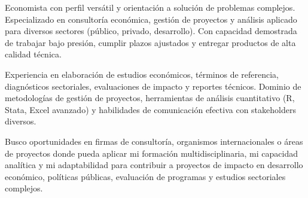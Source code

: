 \par{
	
	Economista con perfil versátil y orientación a solución de problemas complejos. Especializado en consultoría económica, gestión de proyectos y análisis aplicado para diversos sectores (público, privado, desarrollo). Con capacidad demostrada de trabajar bajo presión, cumplir plazos ajustados y entregar productos de alta calidad técnica.
	
	Experiencia en elaboración de estudios económicos, términos de referencia, diagnósticos sectoriales, evaluaciones de impacto y reportes técnicos. Dominio de metodologías de gestión de proyectos, herramientas de análisis cuantitativo (R, Stata, Excel avanzado) y habilidades de comunicación efectiva con stakeholders diversos.
	
	Busco oportunidades en firmas de consultoría, organismos internacionales o áreas de proyectos donde pueda aplicar mi formación multidisciplinaria, mi capacidad analítica y mi adaptabilidad para contribuir a proyectos de impacto en desarrollo económico, políticas públicas, evaluación de programas y estudios sectoriales complejos.

	
	

	
}
